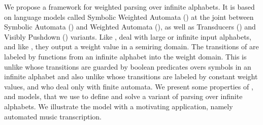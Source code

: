 %
%
We propose a framework for weighted parsing over infinite alphabets.
%
It is based on language models called Symbolic Weighted Automata (\SWA)
at the joint %
between Symbolic Automata (\SA) and Weighted Automata (\WA),
as well as Transducers (\SWT) and Visibly Pushdown (\SWVPA) variants.
%
Like \SA, \SWA deal with large or infinite input alphabets,
and like \WA, they output a weight value in a semiring domain.
The transitions of \SWA are labeled by functions from an infinite alphabet into the weight domain.
This is unlike \SA whose transitions are guarded by boolean predicates
overs symbols in an infinite alphabet
and also unlike \WA whose transitions are labeled by constant weight values,
and who deal only with finite automata.
%
We present some properties of \SWA, \SWT and \SWVPA models,
that we use to define and solve a variant of parsing
over infinite alphabets.
%
We illustrate the model with a motivating application, namely
automated music transcription.
